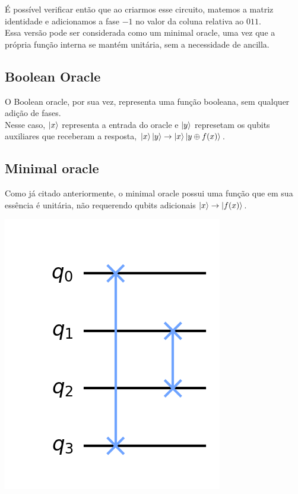 \documentclass{article}
\begin{document}
É possível verificar então que ao criarmos esse circuito, matemos a matriz identidade e adicionamos a fase $-1$ no valor da coluna relativa ao $011$. \\
Essa versão pode ser considerada como um minimal oracle, uma vez que a própria função interna se mantém unitária, sem a necessidade de ancilla.


\subsection{Boolean Oracle}

O Boolean oracle, por sua vez, representa uma função booleana, sem qualquer adição de fases.\\
Nesse caso, $\mathinner{|{x}\rangle}$ representa a entrada do oracle e $\mathinner{|{y}\rangle}$ represetam os qubits auxiliares que receberam a resposta, $\mathinner{|{x}\rangle}\mathinner{|{y}\rangle} \to \mathinner{|{x}\rangle}\mathinner{|{y \oplus f(x)}\rangle}$.

\subsection{Minimal oracle}

Como já citado anteriormente, o minimal oracle possui uma função que em sua essência é unitária, não requerendo qubits adicionais $\mathinner{|{x}\rangle} \to \mathinner{|{f(x)}\rangle}$.

\begin{center}
	\includegraphics[scale=0.3]{minimal-oracle.png}
	\label{fig:minimal-oracle}
\end{center}
\end{document}
